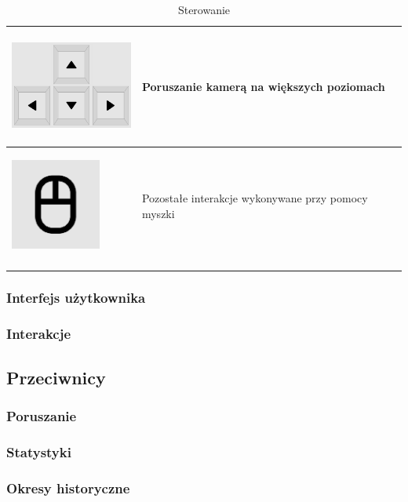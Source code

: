 \documentclass[a4paper,12pt, twoside, titlepage]{article}
\begin{document}
\begin{center}
\begin{longtable}{| p{} | p{} |} 
	\hline
	\begin{center}
		\includegraphics[height=3cm]{import/arrows.pdf}
	\end{center} 
	& Poruszanie kamerą na większych poziomach \\ 
	\hline 
	
	\begin{center}
		\includegraphics[height=3cm]{import/mouse.pdf}
	\end{center}  & Pozostałe interakcje wykonywane przy pomocy myszki \\ 
	\hline
	

	\caption{Sterowanie}	
\end{longtable}
\end{center}

\subsubsection{Interfejs użytkownika}
\subsubsection{Interakcje}
\subsection{Przeciwnicy}
\subsubsection{Poruszanie}
\subsubsection{Statystyki}
\subsubsection{Okresy historyczne}
\end{document}
